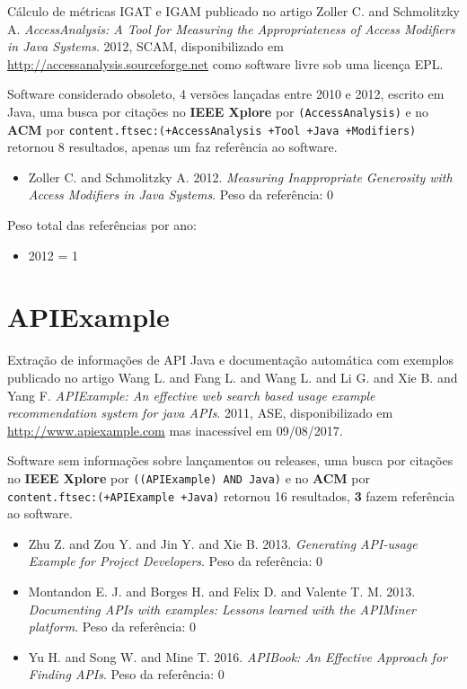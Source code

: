 Cálculo de métricas IGAT e IGAM
publicado no artigo
Zoller C. and Schmolitzky A.
{\it AccessAnalysis: A Tool for Measuring the Appropriateness of Access Modifiers in Java Systems}.
2012,
SCAM,
disponibilizado em \url{http://accessanalysis.sourceforge.net}
como software livre
sob uma licença EPL.

Software considerado obsoleto,
4 versões lançadas
entre 2010 e 2012,
escrito em Java,
uma busca por citações no {\bf IEEE Xplore} por
\texttt{(AccessAnalysis)}
e no {\bf ACM} por
\texttt{content.ftsec:(+AccessAnalysis +Tool +Java +Modifiers)}
retornou
8 resultados,
apenas um faz referência ao software.

\begin{itemize}
\item Zoller C. and Schmolitzky A.
      2012.
      {\it Measuring Inappropriate Generosity with Access Modifiers in Java Systems}.
      Peso da referência: 0
\end{itemize}

Peso total das referências por ano:

\begin{itemize}
\item 2012 = 1
\end{itemize}


\section{APIExample}

Extração de informações de API Java e documentação automática com exemplos
publicado no artigo
Wang L. and Fang L. and Wang L. and Li G. and Xie B. and Yang F.
{\it APIExample: An effective web search based usage example recommendation system for java APIs}.
2011,
ASE,
disponibilizado em \url{http://www.apiexample.com}
mas inacessível em 09/08/2017.

Software sem informações sobre lançamentos ou releases,
uma busca por citações no {\bf IEEE Xplore} por
\texttt{((APIExample) AND Java)}
e no {\bf ACM} por
\texttt{content.ftsec:(+APIExample +Java)}
retornou
16 resultados,
{\bf 3} fazem referência ao software.

\begin{itemize}
\item Zhu Z. and Zou Y. and Jin Y. and Xie B.
      2013.
      {\it Generating API-usage Example for Project Developers}.
      Peso da referência: 0
\item Montandon E. J. and Borges H. and Felix D. and Valente T. M.
      2013.
      {\it Documenting APIs with examples: Lessons learned with the APIMiner platform}.
      Peso da referência: 0
\item Yu H. and Song W. and Mine T.
      2016.
      {\it APIBook: An Effective Approach for Finding APIs}.
      Peso da referência: 0
\end{itemize}

